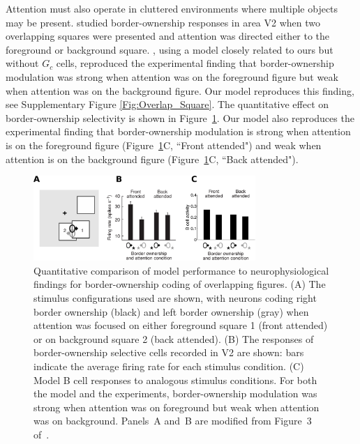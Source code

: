 Attention must also operate in cluttered environments where multiple
objects may be present. \cite{Qiu_etal07} studied border-ownership
responses in area V2 when two overlapping squares were presented and
attention was directed either to the foreground or background square. \cite{Mihalas_etal11b}, using a model closely related to ours but without $G_c$ cells, reproduced the experimental finding that border-ownership modulation was strong when attention was on the foreground figure but weak when attention was on the background
figure. Our model reproduces this finding, see Supplementary Figure
\ref{Fig:Overlap_Square}. The quantitative effect on border-ownership
selectivity is shown in Figure~\ref{Fig:Overlap_Square_exp_model}. 
Our model also reproduces the experimental finding that border-ownership modulation is strong when attention is on the foreground figure (Figure~\ref{Fig:Overlap_Square_exp_model}C,
``Front attended") and weak when attention is on the background
figure (Figure~\ref{Fig:Overlap_Square_exp_model}C, ``Back attended").

\begin{figure}[t!]
\centering
\includegraphics[width=0.75\textwidth]{Contour/figs/Fig9.eps}
\makeatletter
\let\@currsize\normalsize
\caption[Attention modulates border-ownership responses in the presence of multiple objects]{Quantitative comparison of model performance to  neurophysiological findings \citep{Qiu_etal07} for border-ownership coding of overlapping figures. (A) The stimulus configurations used are shown, with neurons coding right border ownership (black) and left border ownership (gray) when attention was focused on either foreground square 1 (front attended) or on background square 2 (back attended). (B) The responses of border-ownership selective cells recorded in V2 are shown:  bars indicate the average firing rate for each stimulus condition. (C) Model B cell responses to analogous stimulus conditions. For both the model and the experiments, border-ownership modulation was strong when attention was on foreground but weak when attention was on background. Panels~A and~B are modified from Figure~3 of~\cite{Qiu_etal07}.}
\label{Fig:Overlap_Square_exp_model}
\end{figure}

